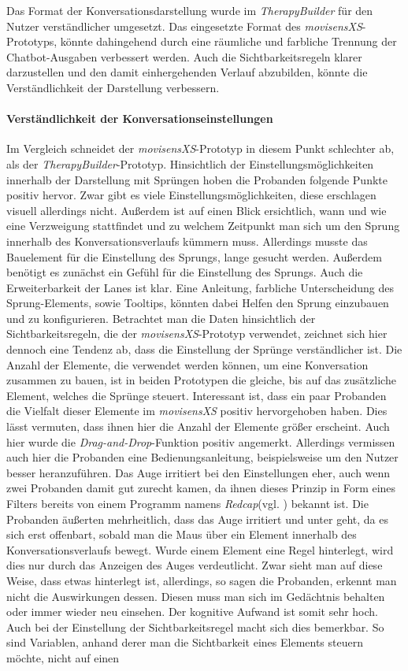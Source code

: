 Das Format der Konversationsdarstellung wurde im \emph{TherapyBuilder} für den Nutzer verständlicher umgesetzt. Das eingesetzte Format des \emph{movisensXS}-Prototyps, könnte dahingehend durch eine räumliche und farbliche Trennung der Chatbot-Ausgaben verbessert werden. Auch die Sichtbarkeitsregeln klarer darzustellen und den damit einhergehenden Verlauf abzubilden, könnte die Verständlichkeit der Darstellung verbessern.

\paragraph{Verständlichkeit der Konversationseinstellungen}
Im Vergleich schneidet der \emph{movisensXS}-Prototyp in diesem Punkt schlechter ab, als der \emph{TherapyBuilder}-Prototyp. Hinsichtlich der Einstellungsmöglichkeiten innerhalb der Darstellung mit Sprüngen hoben die Probanden folgende Punkte positiv hervor. Zwar gibt es viele Einstellungsmöglichkeiten, diese erschlagen visuell allerdings nicht. Außerdem ist auf einen Blick ersichtlich, wann und wie eine Verzweigung stattfindet und zu welchem Zeitpunkt man sich um den Sprung innerhalb des Konversationsverlaufs kümmern muss. Allerdings musste das Bauelement für die Einstellung des Sprungs, lange gesucht werden. Außerdem benötigt es zunächst ein Gefühl für die Einstellung des Sprungs. Auch die Erweiterbarkeit der Lanes ist klar. Eine Anleitung, farbliche Unterscheidung des Sprung-Elements, sowie Tooltips, könnten dabei Helfen den Sprung einzubauen und zu konfigurieren. Betrachtet man die Daten hinsichtlich der Sichtbarkeitsregeln, die der \emph{movisensXS}-Prototyp verwendet, zeichnet sich hier dennoch eine Tendenz ab, dass die Einstellung der Sprünge verständlicher ist. Die Anzahl der Elemente, die verwendet werden können, um eine Konversation zusammen zu bauen, ist in beiden Prototypen die gleiche, bis auf das zusätzliche Element, welches die Sprünge steuert. Interessant ist, dass ein paar Probanden die Vielfalt dieser Elemente im \emph{movisensXS} positiv hervorgehoben haben. Dies lässt vermuten, dass ihnen hier die Anzahl der Elemente größer erscheint. Auch hier wurde die \emph{Drag-and-Drop}-Funktion positiv angemerkt. Allerdings vermissen auch hier die Probanden eine Bedienungsanleitung, beispielsweise um den Nutzer besser heranzuführen. Das Auge irritiert bei den Einstellungen eher, auch wenn zwei Probanden damit gut zurecht kamen, da ihnen dieses Prinzip in Form eines Filters bereits von einem Programm namens \emph{Redcap}(vgl. \cite{REDCap47:online}) bekannt ist. Die Probanden äußerten mehrheitlich, dass das Auge irritiert und unter geht, da es sich erst offenbart, sobald man die Maus über ein Element innerhalb des Konversationsverlaufs bewegt. Wurde einem Element eine Regel hinterlegt, wird dies nur durch das Anzeigen des Auges verdeutlicht. Zwar sieht man auf diese Weise, dass etwas hinterlegt ist, allerdings, so sagen die Probanden, erkennt man nicht die Auswirkungen dessen. Diesen muss man sich im Gedächtnis behalten oder immer wieder neu einsehen. Der kognitive Aufwand ist somit sehr hoch. Auch bei der Einstellung der Sichtbarkeitsregel macht sich dies bemerkbar. So sind Variablen, anhand derer man die Sichtbarkeit eines Elements steuern möchte, nicht auf einen 